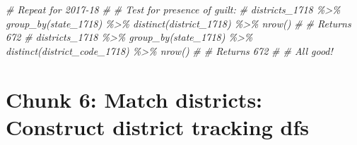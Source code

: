 \documentclass[
]{article}
\newenvironment{Shaded}{\begin{snugshade}}{\end{snugshade}}
\newcommand{\CommentTok}[1]{\textcolor[rgb]{0.56,0.35,0.01}{\textit{#1}}}
\begin{document}
\begin{Shaded}
\begin{Highlighting}[]
\CommentTok{\# Repeat for 2017{-}18}
\CommentTok{\# \# Test for presence of guilt:}
\CommentTok{\# districts\_1718 \%\textgreater{}\% group\_by(state\_1718) \%\textgreater{}\% distinct(district\_1718) \%\textgreater{}\% nrow()}
\CommentTok{\# \# Returns 672}
\CommentTok{\# districts\_1718 \%\textgreater{}\% group\_by(state\_1718) \%\textgreater{}\% distinct(district\_code\_1718) \%\textgreater{}\% nrow()}
\CommentTok{\# \# Returns 672}
\CommentTok{\# \# All good!}
\end{Highlighting}
\end{Shaded}

\section*{Chunk 6: Match districts: Construct district tracking dfs}\label{chunk-6-match-districts-construct-district-tracking-dfs}
\end{document}
